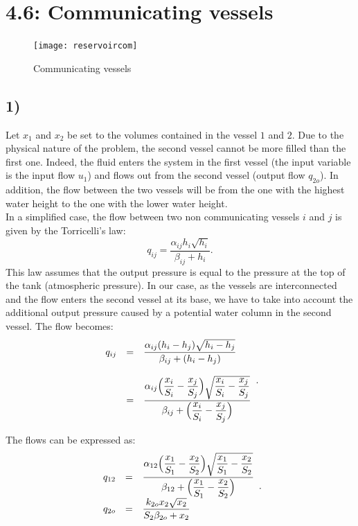 \section*{4.6: Communicating vessels}
\begin{figure}[h!]
  \centering
  \texttt{[image: reservoircom]}
  \caption{Communicating vessels}
  \label{reservoircom}
\end{figure}

\subsection*{1)}
Let $x_1$ and $x_2$ be set to the volumes contained in the vessel $1$ and $2$. Due to the physical nature of the problem, the second vessel cannot be more filled than the first one. Indeed, the fluid enters the system in the first vessel (the input variable is the input flow $u_1$) and flows out from the second vessel (output flow $q_{2o}$). In addition, the flow between the two vessels will be from the one with the highest water height to the one with the lower water height.\\

In a simplified case, the flow between two non communicating vessels $i$ and $j$ is given by the Torricelli's law:
\begin{equation}
q_{ij}=\dfrac{\alpha_{ij}h_i\sqrt{h_i}}{\beta_{ij}+h_i}.
\label{eq:torricelli}
\end{equation}
This law assumes that the output pressure is equal to the pressure at the top of the tank (atmospheric pressure). In our case, as the vessels are interconnected and the flow enters the second vessel at its base, we have to take into account the additional output pressure caused by a potential water column in the second vessel. The flow becomes:
\begin{equation}
	\begin{array}{r c l}
	q_{ij} &=& \dfrac{\alpha_{ij}(h_i-h_j)\sqrt{h_i-h_j}}{\beta_{ij}+(h_i-h_j)}\\
	& & \\
	          &=& \dfrac{\alpha_{ij}\Big(\dfrac{x_i}{S_i}-\dfrac{x_j}{S_j}\Big)\sqrt{\dfrac{x_i}{S_i}-\dfrac{x_j}{S_j}}}{\beta_{ij}+\Big(\dfrac{x_i}{S_i}-\dfrac{x_j}{S_j}\Big)}\\
	  \end{array}.
\label{eq:torricellimod}
\end{equation}

The flows can be expressed as:
\begin{equation}
	\begin{array}{r c l}         
	 q_{12} &=&\dfrac{\alpha_{12}\Big(\dfrac{x_1}{S_1}-\dfrac{x_2}{S_2}\Big)\sqrt{\dfrac{x_1}{S_1}-\dfrac{x_2}{S_2}}}{\beta_{12}+\Big(\dfrac{x_1}{S_1}-\dfrac{x_2}{S_2}\Big)} \\
	 q_{2o}&=&\dfrac{k_{2o}x_2\sqrt{x_2}}{S_2\beta_{2o}+x_2}\\
	\end{array}.
\label{eq:flow6}
\end{equation}

